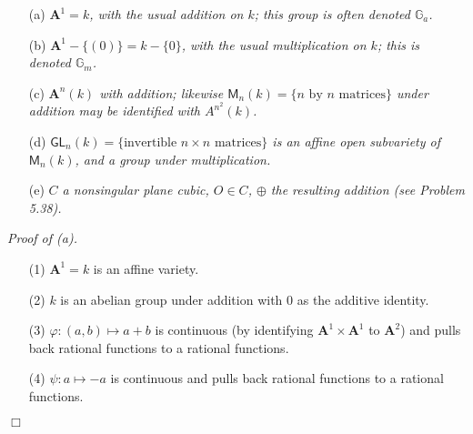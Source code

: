 \documentclass{article}
\begin{document}
\begin{enumerate}
\item[(a)]
  \emph{$\mathbf{A}^{1} = k$,
  with the usual addition on $k$; this group is often denoted $\mathbb{G}_a$.}

\item[(b)]
  \emph{$\mathbf{A}^{1}-\{(0)\} = k - \{0\}$,
  with the usual multiplication on $k$; this is denoted $\mathbb{G}_m$.}

\item[(c)]
  \emph{$\mathbf{A}^{n}(k)$ with addition;
  likewise $\mathsf{M}_n(k) = \{\text{$n$ by $n$ matrices}\}$
  under addition may be identified with $A^{n^2}(k)$.}

\item[(d)]
  \emph{$\mathsf{GL}_n(k) = \{\text{invertible $n \times n$ matrices}\}$
  is an affine open subvariety of $\mathsf{M}_n(k)$,
  and a group under multiplication.}

\item[(e)]
  \emph{$C$ a nonsingular plane cubic, $O \in C$,
  $\oplus$ the resulting addition (see Problem 5.38).} \\
\end{enumerate}



\emph{Proof of (a).}
\begin{enumerate}
\item[(1)]
  $\mathbf{A}^{1} = k$ is an affine variety.

\item[(2)]
  $k$ is an abelian group under addition with $0$ as the additive identity.

\item[(3)]
  $\varphi: (a,b) \mapsto a+b$ is continuous
  (by identifying $\mathbf{A}^{1} \times \mathbf{A}^{1}$ to $\mathbf{A}^{2}$)
  and pulls back rational functions to a rational functions.

\item[(4)]
  $\psi: a \mapsto -a$ is continuous and pulls back rational functions to a rational functions.
\end{enumerate}
$\Box$ \\
\end{document}
